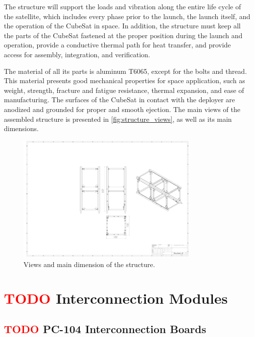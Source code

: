 The structure will support the loads and vibration along the entire life cycle of the satellite, which includes every phase prior to the launch, the launch itself, and the operation of the CubeSat in space. In addition, the structure must keep all the parts of the CubeSat fastened at the proper position during the launch and operation, provide a conductive thermal path for heat transfer, and provide access for assembly, integration, and verification.

The material of all its parts is aluminum T6065, except for the bolts and thread. This material presents good mechanical properties for space application, such as weight, strength, fracture and fatigue resistance, thermal expansion, and ease of manufacturing. The surfaces of the CubeSat in contact with the deployer are anodized and grounded for proper and smooth ejection. The main views of the assembled structure is presented in \autoref{fig:structure_views}, as well as its main dimensions.


\begin{figure}[H]
	\begin{center}
		\includegraphics[width=0.8\textwidth, trim=25cm 8cm 30cm 13cm, clip=true]{figures/subsystems/Structure U2.pdf}
		\caption{Views and main dimension of the structure.}
		\label{fig:structure_views}
	\end{center}
\end{figure}

\section{ \textcolor{red}{TODO} Interconnection Modules}

\subsection{ \textcolor{red}{TODO} PC-104 Interconnection Boards}

